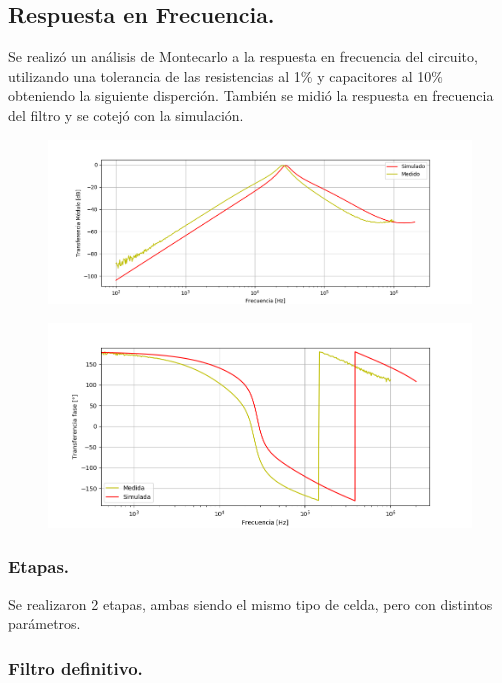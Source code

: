 \subsection{Respuesta en Frecuencia.}
Se realizó un análisis de Montecarlo a la respuesta en frecuencia del circuito, utilizando una tolerancia de las resistencias al 1$\%$ y capacitores al 10$\%$ obteniendo la siguiente disperción.
También se midió la respuesta en frecuencia del filtro y se cotejó con la simulación.
\begin{figure}[H]
	\centering
	\includegraphics[width=\textwidth]{Imagenes-Ej2/BodeRauch.png}
	\label{fig:graph}
\end{figure}
\begin{figure}[H]
	\centering
	\includegraphics[width=\textwidth]{Imagenes-Ej2/BodeRauchFase.png}
	\label{fig:graph}
\end{figure}

\subsubsection{Etapas.}
Se realizaron 2 etapas, ambas siendo el mismo tipo de celda, pero con distintos parámetros.
\subsubsection{Filtro definitivo.}
%

